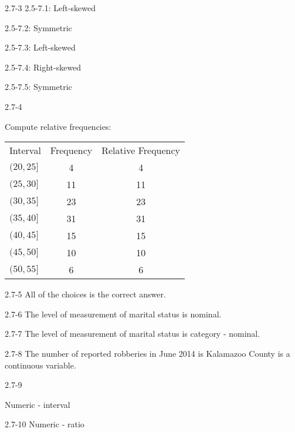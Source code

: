 \begin{exsol@solution}{2.7-3}
2.5-7.1: Left-skewed

2.5-7.2: Symmetric

2.5-7.3: Left-skewed

2.5-7.4: Right-skewed

2.5-7.5: Symmetric

\end{exsol@solution}
\begin{exsol@solution}{2.7-4}

Compute relative frequencies:

\begin{tabular}{@{} lcc @{}} \hline
Interval  &  Frequency &	Relative Frequency \\
$(20, 25]$ 	&     4 & 4  \\
$(25, 30]$ 	&    11 & 11 \\
$(30, 35]$ 	&    23 & 23 \\
$(35, 40]$ 	&    31 & 31 \\
$(40, 45]$ 	&    15 & 15 \\
$(45, 50]$ 	&    10 & 10 \\
$(50, 55]$ 	&     6 & 6 \\ \hline
\end{tabular}


\end{exsol@solution}
\begin{exsol@solution}{2.7-5}
    All of the choices is the correct answer.
\end{exsol@solution}
\begin{exsol@solution}{2.7-6}
	  The level of measurement of marital status is nominal.
\end{exsol@solution}
\begin{exsol@solution}{2.7-7}
	  The level of measurement of marital status is category - nominal.
\end{exsol@solution}
\begin{exsol@solution}{2.7-8}
	  The number of reported robberies in June 2014 is Kalamazoo County is a continuous variable.
\end{exsol@solution}
\begin{exsol@solution}{2.7-9}

    Numeric - interval

\end{exsol@solution}
\begin{exsol@solution}{2.7-10}
    Numeric - ratio
\end{exsol@solution}
